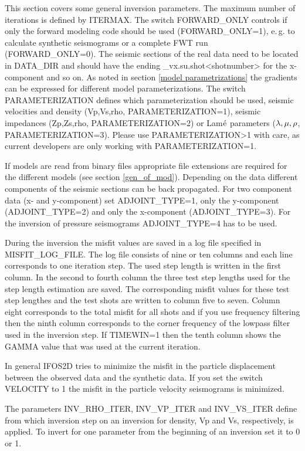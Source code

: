 This section covers some general inversion parameters. The maximum number of iterations is defined by ITERMAX. The switch FORWARD\_ONLY controls if only the forward modeling code should be used (FORWARD\_ONLY=1), e.\,g. to calculate synthetic seismograms or a complete FWT run (FORWARD\_ONLY=0). The seismic sections of the real data need to be located in DATA\_DIR and should have the ending \_vx.su.shot<shotnumber> for the x-component and so on. As noted in section \ref{model parametrizations} the gradients can be expressed for different model parameterizations. The switch PARAMETERIZATION defines which parameterization should be used, seismic velocities and density (Vp,Vs,rho, PARAMETERIZATION=1), seismic impedances (Zp,Zs,rho, PARAMETERIZATION=2) or Lam$\rm{\acute{e}}$ parameters ($\rm{\lambda,\mu,\rho}$, PARAMETERIZATION=3). Please use PARAMETERIZATION>1 with care, as current developers are only working with PARAMETERIZATION=1.

If models are read from binary files appropriate file extensions are required for the different models (see section \ref{gen_of_mod}). Depending on the data different components of the seismic sections can be back propagated. For two component data (x- and y-component) set ADJOINT\_TYPE=1, only the y-component (ADJOINT\_TYPE=2) and only the x-component (ADJOINT\_TYPE=3). For the inversion of pressure seismograms ADJOINT\_TYPE=4 has to be used.

During the inversion the misfit values are saved in a log file specified in MISFIT\_LOG\_FILE. The log file consists of nine or ten columns and each line corresponds to one iteration step. The used step length is written in the first column. In the second to fourth column the three test step lengths used for the step length estimation are saved. The corresponding misfit values for these test step lengthes and the test shots are written to column five to seven. Column eight corresponds to the total misfit for all shots and if you use frequency filtering then the ninth column corresponds to the corner frequency of the lowpass filter used in the inversion step. If TIMEWIN=1 then the tenth column shows the GAMMA value that was used at the current iteration.

In general IFOS2D tries to minimize the misfit in the particle displacement between the observed data and the synthetic data. If you set the switch VELOCITY to 1 the misfit in the particle velocity seismograms is minimized.

The parameters INV\_RHO\_ITER, INV\_VP\_ITER and INV\_VS\_ITER define from which inversion step on an inversion for density, Vp and Vs, respectively, is applied. To invert for one parameter from the beginning of an inversion set it to 0 or 1.


